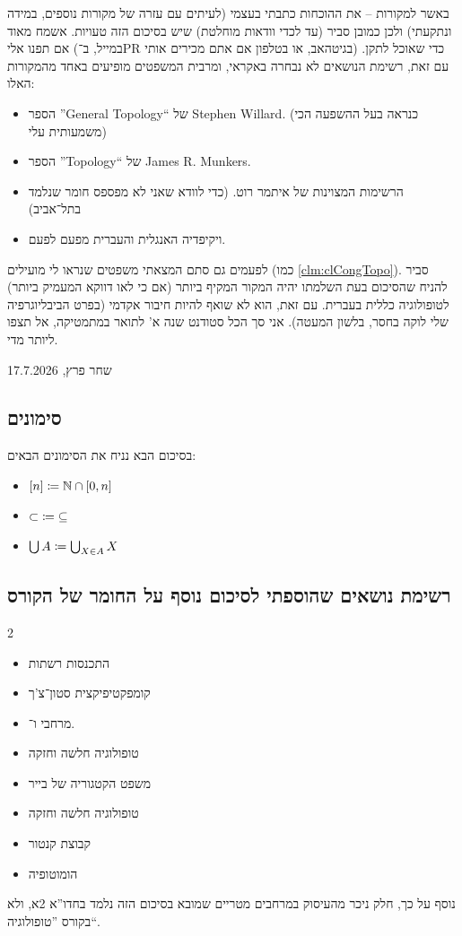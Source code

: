 \documentclass[name=רשימות טופולוגיה כללית]{../../../tex/classes/noChapterMegasumPreamble}
\begin{document}
	באשר למקורות – את ההוכחות כתבתי בעצמי (לעיתים עם עזרה של מקורות נוספים, במידה ונתקעתי) ולכן כמובן סביר (עד לכדי וודאות מוחלטת) שיש בסיכום הזה טעויות. אשמח מאוד אם תפנו אלי (במייל, ב־PR בגיטהאב, או בטלפון אם אתם מכירים אותי) כדי שאוכל לתקן. עם זאת, רשימת הנושאים לא נבחרה באקראי, ומרבית המשפטים מופיעים באחד מהמקורות האלו:
	\begin{itemize}
		\item הספר ''General Topology`` של Stephen Willard. (כנראה בעל ההשפעה הכי משמעותית עלי)
		\item הספר ''Topology`` של James R. Munkers. 
		\item הרשימות המצוינות של איתמר רוט. (כדי לוודא שאני לא מפספס חומר שנלמד בתל־אביב)
		\item ויקיפדיה האנגלית והעברית מפעם לפעם. 
	\end{itemize}
	לפעמים גם סתם המצאתי משפטים שנראו לי מועילים (כמו \ref{clm:clCongTopo}). סביר להניח שהסיכום בעת השלמתו יהיה המקור המקיף ביותר (אם כי לאו דווקא המעמיק ביותר) לטופולוגיה כללית בעברית. עם זאת, הוא לא שואף להיות חיבור אקדמי (בפרט הביבליוגרפיה שלי לוקה בחסר, בלשון המעטה). אני סך הכל סטודנט שנה א' לתואר במתמטיקה, אל תצפו ליותר מדי. 
		
		\hfill שחר פרץ, 17.7.2026
	
	
	
\subsection{סימונים}
	בסיכום הבא נניח את הסימונים הבאים: 
		\begin{itemize}
		\item \hfil $[n] \coloneqq \mathbb{N} \cap [0, n]$
		\item \hfil $\subset \; \coloneqq \; \subseteq$
		\item \hfil $\bigcup A \coloneqq \bigcup_{X \in A}X$
	\end{itemize}
	
\subsection{רשימת נושאים שהוספתי לסיכום נוסף על החומר של הקורס}
	\begin{multicols}{2}
		\begin{itemize}
			\item התכנסות רשתות
			\item קומפקטיפיקצית סטון־צ'ך
			\item מרחבי \Tt ו־\Ty. 
			\item טופולוגיה חלשה וחזקה
			\item משפט הקטגוריה של בייר
			\item טופולוגיה חלשה וחזקה
			\item קבוצת קנטור
			\item הומוטופיה
		\end{itemize}
	\end{multicols}
	נוסף על כך, חלק ניכר מהעיסוק במרחבים מטריים שמובא בסיכום הזה נלמד בחדו''א 2א, ולא בקורס ''טופולוגיה``. 
	
\end{document}
